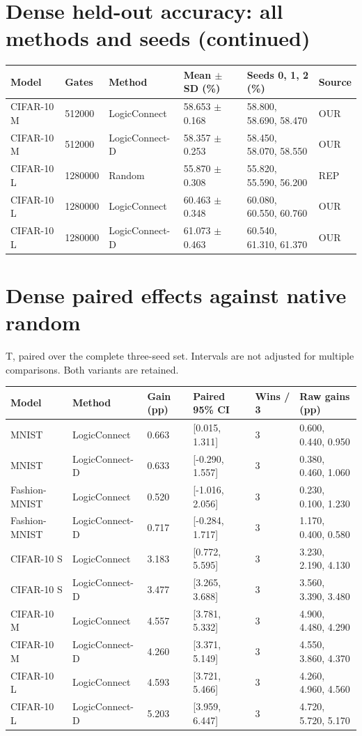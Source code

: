 \documentclass[10pt,a4paper]{article}
\begin{document}
\section*{Dense held-out accuracy: all methods and seeds (continued)}
\setlength{\tabcolsep}{2pt}
\begin{tabular}{@{}p{57mm}p{37.0mm}p{37.0mm}p{37.0mm}p{37.0mm}p{37.0mm}@{}}
\toprule
Model & Gates & Method & Mean $\pm$ SD (\%) & Seeds 0, 1, 2 (\%) & Source \\ \midrule
CIFAR-10 M & 512000 & LogicConnect & 58.653 $\pm$ 0.168 & 58.800, 58.690, 58.470 & OUR \\
CIFAR-10 M & 512000 & LogicConnect-D & 58.357 $\pm$ 0.253 & 58.450, 58.070, 58.550 & OUR \\
CIFAR-10 L & 1280000 & Random & 55.870 $\pm$ 0.308 & 55.820, 55.590, 56.200 & REP \\
CIFAR-10 L & 1280000 & LogicConnect & 60.463 $\pm$ 0.348 & 60.080, 60.550, 60.760 & OUR \\
CIFAR-10 L & 1280000 & LogicConnect-D & 61.073 $\pm$ 0.463 & 60.540, 61.310, 61.370 & OUR \\
\bottomrule
\end{tabular}
\clearpage
\section*{Dense paired effects against native random}
T, paired over the complete three-seed set. Intervals are not adjusted for multiple comparisons. Both variants are retained.
\par\bigskip
\setlength{\tabcolsep}{2pt}
\begin{tabular}{@{}p{57mm}p{37.0mm}p{37.0mm}p{37.0mm}p{37.0mm}p{37.0mm}@{}}
\toprule
Model & Method & Gain (pp) & Paired 95\% CI & Wins / 3 & Raw gains (pp) \\ \midrule
MNIST & LogicConnect & 0.663 & [0.015, 1.311] & 3 & 0.600, 0.440, 0.950 \\
MNIST & LogicConnect-D & 0.633 & [-0.290, 1.557] & 3 & 0.380, 0.460, 1.060 \\
Fashion-MNIST & LogicConnect & 0.520 & [-1.016, 2.056] & 3 & 0.230, 0.100, 1.230 \\
Fashion-MNIST & LogicConnect-D & 0.717 & [-0.284, 1.717] & 3 & 1.170, 0.400, 0.580 \\
CIFAR-10 S & LogicConnect & 3.183 & [0.772, 5.595] & 3 & 3.230, 2.190, 4.130 \\
CIFAR-10 S & LogicConnect-D & 3.477 & [3.265, 3.688] & 3 & 3.560, 3.390, 3.480 \\
CIFAR-10 M & LogicConnect & 4.557 & [3.781, 5.332] & 3 & 4.900, 4.480, 4.290 \\
CIFAR-10 M & LogicConnect-D & 4.260 & [3.371, 5.149] & 3 & 4.550, 3.860, 4.370 \\
CIFAR-10 L & LogicConnect & 4.593 & [3.721, 5.466] & 3 & 4.260, 4.960, 4.560 \\
CIFAR-10 L & LogicConnect-D & 5.203 & [3.959, 6.447] & 3 & 4.720, 5.720, 5.170 \\
\bottomrule
\end{tabular}
\clearpage
\end{document}
